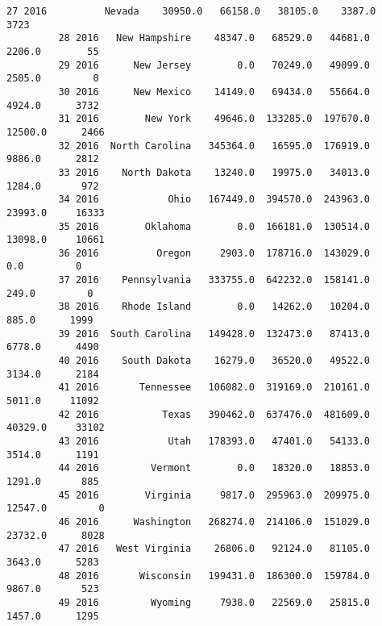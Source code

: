 \documentclass[11pt]{article}
\begin{document}
\begin{Verbatim}[commandchars=\\\{\}]
         27 2016          Nevada    30950.0   66158.0   38105.0    3387.0      3723   
         28 2016   New Hampshire    48347.0   68529.0   44681.0    2206.0        55   
         29 2016      New Jersey        0.0   70249.0   49099.0    2505.0         0   
         30 2016      New Mexico    14149.0   69434.0   55664.0    4924.0      3732   
         31 2016        New York    49646.0  133285.0  197670.0   12500.0      2466   
         32 2016  North Carolina   345364.0   16595.0  176919.0    9886.0      2812   
         33 2016    North Dakota    13240.0   19975.0   34013.0    1284.0       972   
         34 2016            Ohio   167449.0  394570.0  243963.0   23993.0     16333   
         35 2016        Oklahoma        0.0  166181.0  130514.0   13098.0     10661   
         36 2016          Oregon     2903.0  178716.0  143029.0       0.0         0   
         37 2016    Pennsylvania   333755.0  642232.0  158141.0     249.0         0   
         38 2016    Rhode Island        0.0   14262.0   10204.0     885.0      1999   
         39 2016  South Carolina   149428.0  132473.0   87413.0    6778.0      4490   
         40 2016    South Dakota    16279.0   36520.0   49522.0    3134.0      2184   
         41 2016       Tennessee   106082.0  319169.0  210161.0    5011.0     11092   
         42 2016           Texas   390462.0  637476.0  481609.0   40329.0     33102   
         43 2016            Utah   178393.0   47401.0   54133.0    3514.0      1191   
         44 2016         Vermont        0.0   18320.0   18853.0    1291.0       885   
         45 2016        Virginia     9817.0  295963.0  209975.0   12547.0         0   
         46 2016      Washington   268274.0  214106.0  151029.0   23732.0      8028   
         47 2016   West Virginia    26806.0   92124.0   81105.0    3643.0      5283   
         48 2016       Wisconsin   199431.0  186300.0  159784.0    9867.0       523   
         49 2016         Wyoming     7938.0   22569.0   25815.0    1457.0      1295   
         

\end{Verbatim}
\end{document}
